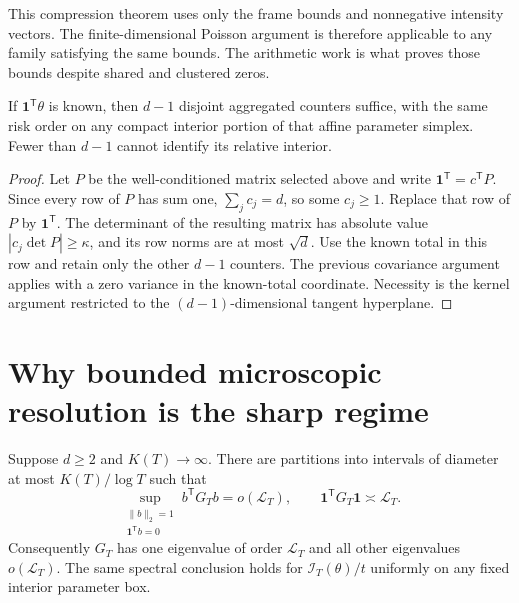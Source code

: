 This compression theorem uses only the frame bounds and nonnegative
intensity vectors.  The finite-dimensional Poisson argument is therefore
applicable to any family satisfying the same bounds.  The arithmetic
work is what proves those bounds despite shared and clustered zeros.

\begin{corollary}\label{mix:cor:normalized}
If $\boldsymbol1^{\mathsf T}\theta$ is known, then $d-1$ disjoint
aggregated counters suffice, with the same risk order on any compact
interior portion of that affine parameter simplex.  Fewer than $d-1$
cannot identify its relative interior.
\end{corollary}

\begin{proof}
Let $P$ be the well-conditioned matrix selected above and write
$\boldsymbol1^{\mathsf T}=c^{\mathsf T}P$.  Since every row of $P$ has
sum one, $\sum_jc_j=d$, so some $c_j\ge1$.  Replace that row of $P$ by
$\boldsymbol1^{\mathsf T}$.  The determinant of the resulting matrix has
absolute value $|c_j\det P|\ge\kappa$, and its row norms are at most
$\sqrt d$.  Use the known total in this row and retain only the other
$d-1$ counters.  The previous covariance argument applies with a zero
variance in the known-total coordinate.  Necessity is the kernel
argument restricted to the $(d-1)$-dimensional tangent hyperplane.
\end{proof}

\section{Why bounded microscopic resolution is the sharp regime}

\begin{theorem}\label{mix:thm:collapse}
Suppose $d\ge2$ and $K(T)\to\infty$.  There are partitions into intervals
of diameter at most $K(T)/\log T$ such that
\[
 \sup_{\substack{\|b\|_2=1\\\boldsymbol1^{\mathsf T}b=0}}
       b^{\mathsf T}G_Tb=o(\mathcal L_T),
 \qquad
 \boldsymbol1^{\mathsf T}G_T\boldsymbol1
       \asymp\mathcal L_T.
\tag{MF13}
\]
Consequently $G_T$ has one eigenvalue of order $\mathcal L_T$ and all
other eigenvalues $o(\mathcal L_T)$.  The same spectral conclusion holds
for $\mathcal I_T(\theta)/t$ uniformly on any fixed interior parameter box.
\end{theorem}

